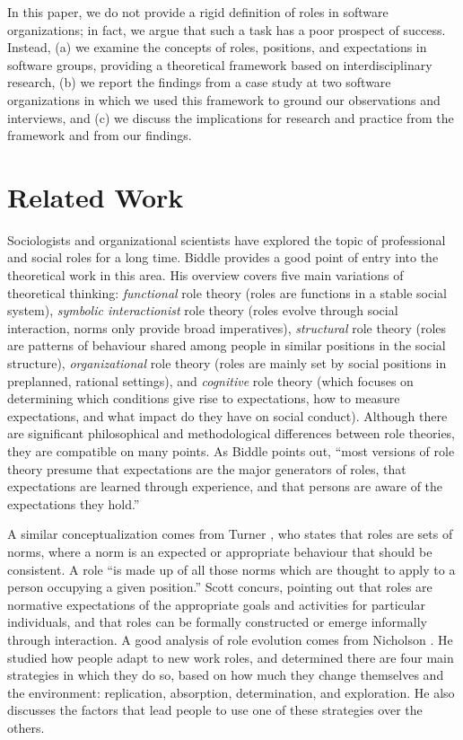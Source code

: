 \documentclass[10pt, conference, compsocconf]{IEEEtran}
\begin{document}
In this paper, we do not provide a rigid definition of roles in software organizations; in fact, we argue that such a task has a poor prospect of success. Instead, (a) we examine the concepts of roles, positions, and expectations in software groups, providing a theoretical framework based on interdisciplinary research, (b) we report the findings from a case study at two software organizations in which we used this framework to ground our observations and interviews, and (c) we discuss the implications for research and practice from the framework and from our findings.




\section{Related Work}

Sociologists and organizational scientists have explored the topic of professional and social roles for a long time. Biddle \cite{Biddle1986} provides a good point of entry into the theoretical work in this area. His overview covers five main variations of theoretical thinking: \emph{functional} role theory (roles are functions in a stable social system), \emph{symbolic interactionist} role theory (roles evolve through social interaction, norms only provide broad imperatives), \emph{structural} role theory (roles are patterns of behaviour shared among people in similar positions in the social structure), \emph{organizational} role theory (roles are mainly set by social positions in preplanned, rational settings), and \emph{cognitive} role theory (which focuses on determining which conditions give rise to expectations, how to measure expectations, and what impact do they have on social conduct). Although there are significant philosophical and methodological differences between role theories, they are compatible on many points. As Biddle points out, ``most versions of role theory presume that expectations are the major generators of roles, that expectations are learned through experience, and that persons are aware of the expectations they hold.''

A similar conceptualization comes from Turner \cite{Turner1956}, who states that roles are sets of norms, where a norm is an expected or appropriate behaviour that should be consistent. A role ``is made up of all those norms which are thought to apply to a person occupying a given position.'' Scott \cite{Scott2008} concurs, pointing out that roles are normative expectations of the appropriate goals and activities for particular individuals, and that roles can be formally constructed or emerge informally through interaction. A good analysis of role evolution comes from Nicholson \cite{Nicholson1984}. He studied how people adapt to new work roles, and determined there are four main strategies in which they do so, based on how much they change themselves and the environment: replication, absorption, determination, and exploration. He also discusses the factors that lead people to use one of these strategies over the others.
\end{document}
